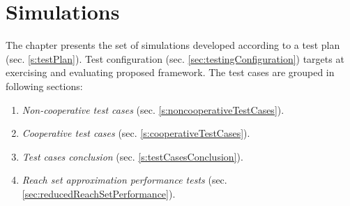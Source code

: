\cleardoublepage
\chapter{Simulations}\label{Simulations}


\noindent The chapter presents the set of simulations developed according to a test plan (sec. \ref{s:testPlan}). Test configuration (sec. \ref{sec:testingConfiguration}) targets at exercising and evaluating proposed framework. The test cases are grouped in following sections:
\begin{enumerate}
    \item \emph{Non-cooperative test cases} (sec. \ref{s:noncooperativeTestCases}).
    \item \emph{Cooperative test cases} (sec. \ref{s:cooperativeTestCases}).
    \item \emph{Test cases conclusion} (sec. \ref{s:testCasesConclusion}).
    \item \emph{Reach set approximation performance tests} (sec. \ref{sec:reducedReachSetPerformance}).
\end{enumerate}